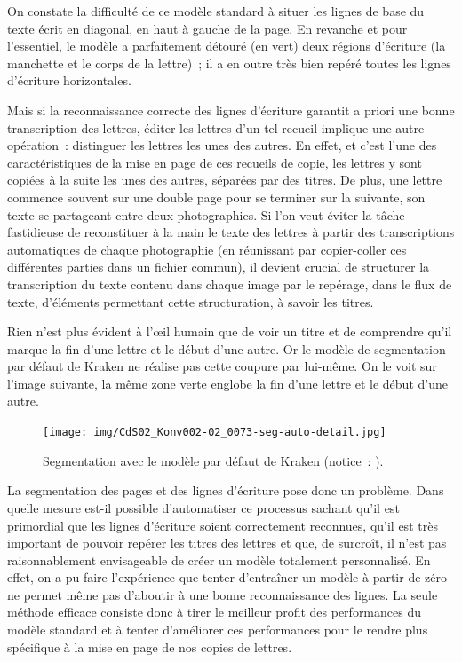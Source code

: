 \documentclass[a4paper,12pt,twoside]{book}
\begin{document}
				On constate la difficulté de ce modèle standard à situer les lignes de base du texte écrit en diagonal, en haut à gauche de la page. En revanche et pour l'essentiel, le modèle a parfaitement détouré (en vert) deux régions d'écriture (la manchette et le corps de la lettre)~; il a en outre très bien repéré toutes les lignes d'écriture horizontales.
				
				Mais si la reconnaissance correcte des lignes d'écriture garantit a priori une bonne transcription des lettres, éditer les lettres d'un tel recueil implique une autre opération~: distinguer les lettres les unes des autres. En effet, et c'est l'une des caractéristiques de la mise en page de ces recueils de copie, les lettres y sont copiées à la suite les unes des autres, séparées par des titres. De plus, une lettre commence souvent sur une double page pour se terminer sur la suivante, son texte se partageant entre deux photographies. Si l'on veut éviter la tâche fastidieuse de reconstituer à la main le texte des lettres à partir des transcriptions automatiques de chaque photographie (en réunissant par copier-coller ces différentes parties dans un fichier commun), il devient crucial de structurer la transcription du texte contenu dans chaque image par le repérage, dans le flux de texte, d'éléments permettant cette structuration, à savoir les titres.
				
				Rien n'est plus évident à l'œil humain que de voir un titre et de comprendre qu'il marque la fin d'une lettre et le début d'une autre. Or le modèle de \gls{segmentation} par défaut de Kraken ne réalise pas cette coupure par lui-même. On le voit sur l'image suivante, la même zone verte englobe la fin d'une lettre et le début d'une autre.
				
				\begin{figure}[!h]
					\centering
					\texttt{[image: img/CdS02\_Konv002-02\_0073-seg-auto-detail.jpg]}
					\caption{Segmentation avec le modèle par défaut de Kraken (notice~: \cite{CdS02073}).}
					\label{}
				\end{figure}
				
				La \gls{segmentation} des pages et des lignes d'écriture pose donc un problème. Dans quelle mesure est-il possible d'automatiser ce processus sachant qu'il est primordial que les lignes d'écriture soient correctement reconnues, qu'il est très important de pouvoir repérer les titres des lettres et que, de surcroît, il n'est pas raisonnablement envisageable de créer un modèle totalement personnalisé. En effet, on a pu faire l'expérience que tenter d'entraîner un modèle à partir de zéro ne permet même pas d'aboutir à une bonne reconnaissance des lignes. La seule méthode efficace consiste donc à tirer le meilleur profit des performances du modèle standard et à tenter d'améliorer ces performances pour le rendre plus spécifique à la mise en page de nos copies de lettres.
				
\end{document}
